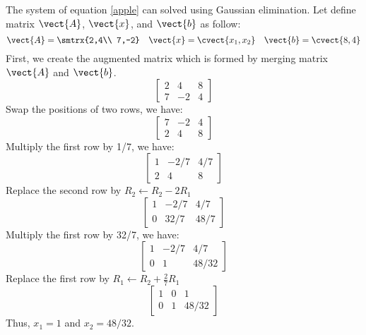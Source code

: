 \begin{example}
The system of equation \eqref{apple} can solved using Gaussian elimination. Let define matrix $\vect{A}$, $\vect{x}$, and $\vect{b}$ as follow:
\[ \vect{A}=\smtrx{2,4\\ 7,-2} \quad \vect{x}=\cvect{x_1,x_2} \quad \vect{b}=\cvect{8,4} \] 
First, we create the augmented matrix which is formed by merging matrix $\vect{A}$ and $\vect{b}$.
\begin{equation*}
    \left[{\begin{array}{cc|c}
        2&4&8 \\ 7&-2&4
    \end{array}}\right]
\end{equation*}
Swap the positions of two rows, we have:
\begin{equation*}
    \left[{\begin{array}{cc|c}
        7&-2&4 \\ 2&4&8
    \end{array}}\right]
\end{equation*}
Multiply the first row by 1/7, we have:
\begin{equation*}
    \left[{\begin{array}{cc|c}
        1&-2/7&4/7 \\ 2&4&8
    \end{array}}\right]
\end{equation*}
Replace the second row by $R_2 \leftarrow R_2-2R_1$
\begin{equation*}
    \left[{\begin{array}{cc|c}
        1&-2/7&4/7 \\ 0&32/7&48/7
    \end{array}}\right]
\end{equation*}
Multiply the first row by 32/7, we have:
\begin{equation*}
    \left[{\begin{array}{cc|c}
        1&-2/7&4/7 \\ 0&1&48/32
    \end{array}}\right]
\end{equation*}
Replace the first row by $R_1 \leftarrow R_2+ \frac{2}{7} R_1$
\begin{equation*}
    \left[{\begin{array}{cc|c}
        1&0&1 \\ 0&1&48/32
    \end{array}}\right]
\end{equation*}
Thus, $x_1=1$ and $x_2=48/32$.
\end{example}
